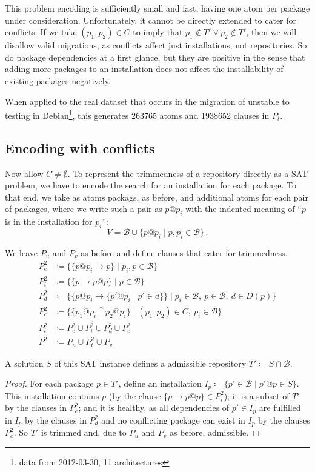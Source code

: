 \documentclass[halfparskip,11pt]{scrartcl}
\begin{document}
This problem encoding is sufficiently small and fast, having one atom per package under consideration. Unfortunately, it cannot be directly extended to cater for conflicts: If we take $(p_1,p_2)\in C$ to imply that $p_1 \notin T' \vee p_2 \notin T'$, then we will disallow valid migrations, as conflicts affect just installations, not repositories. So do package dependencies at a first glance, but they are positive in the sense that adding more packages to an installation does not affect the installability of existing packages negatively.

When applied to the real dataset that occurs in the migration of unstable to testing in Debian\footnote{data from 2012-03-30, 11 architectures}, this generates 263765 atoms and 1938652 clauses in $P_t$.

\subsection{Encoding with conflicts}

Now allow $C\ne \emptyset$. To represent the trimmedness of a repository directly as a SAT problem, we have to encode the search for an installation for each package. To that end, we take as atoms packags, as before, and additional atoms for each pair of packages, where we write such a pair as $p@p_i$ with the indented meaning of ``$p$ is in the installation for $p_i$'':
\[
V = \mathcal B \cup \{ p@p_i \mid p,p_i \in \mathcal B \}\,.
\]

We leave $P_u$ and $P_v$ as before and define clauses that cater for trimmedness.
\begin{align*}
P^2_e &\coloneqq \{ \{p@p_i \to p\} \mid p_i,p \in\mathcal B\} \\
P^2_i &\coloneqq \{ \{p \to p@p\} \mid p \in\mathcal B\} \\
P^2_d &\coloneqq \{ \{p@p_i \to  \{p'@p_i \mid p'\in d\}\} \mid p_i\in \mathcal B,\ p\in \mathcal B,\ d \in D(p)\}\\
P^2_c &\coloneqq \{ \{p_1@p_i \uparrow p_2@p_i\} \mid (p_1,p_2)\in C,\ p_i\in \mathcal B\}\\
P^2_t &\coloneqq P^2_e \cup P^2_i \cup P^2_d \cup P^2_c \\
P^2 &\coloneqq P_u \cup P^2_t \cup P_v
\end{align*}
 

A solution $S$ of this SAT instance defines a admissible repository $T' \coloneqq S\cap\mathcal B$.

\begin{proof}
For each package $p\in T'$, define an installation $I_p \coloneqq \{ p' \in \mathcal B \mid p'@p\in S\}$. This installation contains $p$ (by the clause $\{p \to p@p\}\in P^2_i$); it is a subset of $T'$ by the clauses in $P^2_e$; and it is healthy, as all dependencies of $p'\in I_p$ are fulfilled in $I_p$ by the clauses in $P^2_d$ and no conflicting package can exist in $I_p$ by the clauses $P^2_c$. So $T'$ is trimmed and, due to $P_u$ and $P_v$ as before, admissible.
\end{proof}
\end{document}
